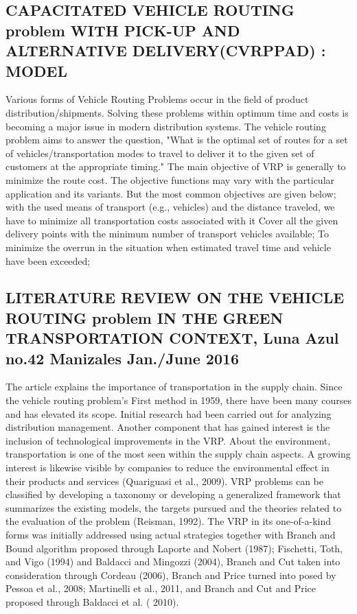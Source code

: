 \documentclass[conference]{IEEEtran}
\begin{document}
\subsection{{\textbf{CAPACITATED VEHICLE ROUTING problem WITH PICK-UP AND ALTERNATIVE DELIVERY(CVRPPAD) : MODEL 
}}}
Various forms of Vehicle Routing Problems occur in the field of product distribution/shipments. Solving these problems within optimum time and costs is becoming a major issue in modern distribution systems. The vehicle routing problem aims to answer the question, "What is the optimal set of routes for a set of vehicles/transportation modes to travel to deliver it to the given set of customers at the appropriate timing." The main objective of VRP is generally to minimize the route cost. The objective functions may vary with the particular application and its variants. But the most common objectives are given below; with the used means of transport (e.g., vehicles) and the distance traveled, we have to minimize all transportation costs associated with it Cover all the given delivery points with the minimum number of transport vehicles available; To minimize the overrun in the situation when estimated travel time and vehicle have been exceeded;\\

\subsection{{\textbf{LITERATURE REVIEW ON THE VEHICLE ROUTING problem IN THE GREEN TRANSPORTATION CONTEXT, Luna Azul  no.42 Manizales Jan./June 2016
}}}
The article explains the importance of transportation in the supply chain. Since the vehicle routing problem's First method in 1959, there have been many courses and has elevated its scope. Initial research had been carried out for analyzing distribution management. Another component that has gained interest is the inclusion of technological improvements in the VRP. About the environment, transportation is one of the most seen within the supply chain aspects. A growing interest is likewise visible by companies to reduce the environmental effect in their products and services (Quariguasi et al., 2009). VRP problems can be classified by developing a taxonomy or developing a generalized framework that summarizes the existing models, the targets pursued and the theories related to the evaluation of the problem (Reisman, 1992). The VRP in its one-of-a-kind forms was initially addressed using actual strategies together with Branch and Bound algorithm proposed through Laporte and Nobert (1987); Fischetti, Toth, and Vigo (1994) and Baldacci and Mingozzi (2004), Branch and Cut taken into consideration through Cordeau (2006), Branch and Price turned into posed by Pessoa et al., 2008; Martinelli et al.,
2011, and Branch and Cut and Price proposed through Baldacci et al. ( 2010).
\\
\end{document}
